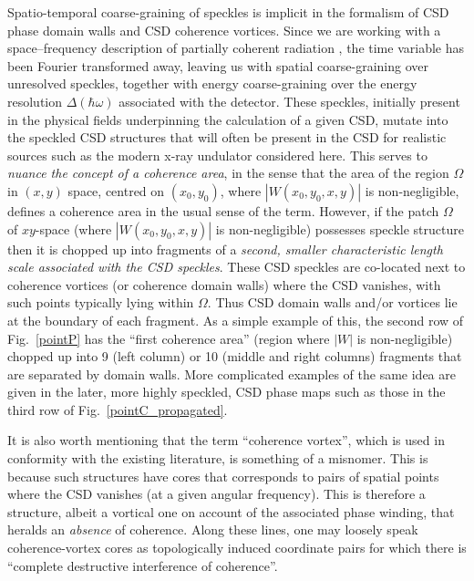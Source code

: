 \documentclass[%
 reprint,
 amsmath,amssymb,
 aps,
]{revtex4-1}
\begin{document}
Spatio-temporal coarse-graining of speckles is implicit in the formalism of CSD phase domain walls and CSD coherence vortices.  Since we are working with a space--frequency description of partially coherent radiation \cite{Wolf1982}, the time variable has been Fourier transformed away, leaving us with spatial coarse-graining over unresolved speckles, together with energy coarse-graining over the energy resolution $\Delta(\hbar\omega)$ associated with the detector.  These speckles, initially present in the physical fields underpinning the calculation of a given CSD, mutate into the speckled CSD structures that will often be present in the CSD for realistic sources such as the modern x-ray undulator considered here.  This serves to {\em nuance the concept of a coherence area}, in the sense that the area of the region $\Omega$ in $(x,y)$ space, centred on $(x_0,y_0)$, where $|W(x_0,y_0,x,y)|$ is non-negligible, defines a coherence area in the usual sense of the term.  However, if the patch $\Omega$ of $xy$-space (where $|W(x_0,y_0,x,y)|$ is non-negligible) possesses speckle structure then it is chopped up into fragments of a {\em second, smaller characteristic length scale associated with the CSD speckles}.  These CSD speckles are co-located next to coherence vortices (or coherence domain walls) where the CSD vanishes, with such points typically lying within $\Omega$.  Thus CSD domain walls and/or vortices lie at the boundary of each fragment.  As a simple example of this, the second row of Fig.~\ref{pointP} has the ``first coherence area'' (region where $|W|$ is non-negligible) chopped up into 9 (left column) or 10 (middle and right columns) fragments that are separated by domain walls.  More complicated examples of the same idea are given in the later, more highly speckled, CSD phase maps such as those in the third row of Fig.~\ref{pointC_propagated}.

It is also worth mentioning that the term ``coherence vortex'', which is used in conformity with the existing literature, is something of a misnomer.  This is because such structures have cores that corresponds to pairs of spatial points where the CSD vanishes (at a given angular frequency).  This is therefore a structure, albeit a vortical one on account of the associated phase winding, that heralds an {\em absence} of coherence. Along these lines, one may loosely speak coherence-vortex cores as topologically induced coordinate pairs for which there is ``complete destructive interference of coherence''.
\end{document}
